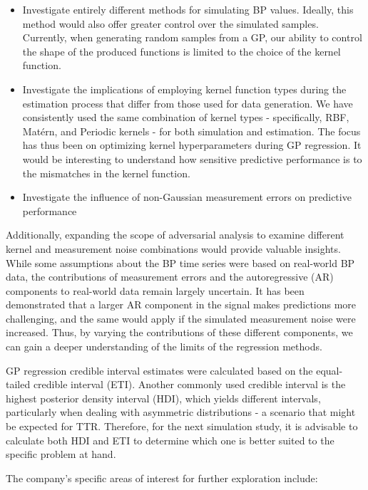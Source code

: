 \begin{itemize}
    \item Investigate entirely different methods for simulating BP values.
    Ideally, this method would also offer greater control over the simulated samples.
    Currently, when generating random samples from a GP, our ability to control the shape of the produced
    functions is limited to the choice of the kernel function.
    \item Investigate the implications of employing kernel function types
    during the estimation process that differ from those used for data generation.
    We have consistently used the same combination of kernel types - specifically, RBF, Matérn, and Periodic kernels -
    for both simulation and estimation.
    The focus has thus been on optimizing kernel hyperparameters during GP regression.
    It would be interesting to understand how sensitive predictive performance is to the mismatches in
    the kernel function.
    \item Investigate the influence
    of non-Gaussian measurement errors on predictive performance
\end{itemize}

Additionally, expanding the scope of adversarial analysis to examine different
kernel and measurement noise combinations would provide valuable insights.
While some assumptions about the BP time series were based on real-world BP data,
the contributions of measurement errors and the autoregressive (AR) components
to real-world data remain largely uncertain.
It has been demonstrated that a larger AR component in the signal makes predictions
more challenging, and the same would apply if the simulated measurement noise were increased.
Thus, by varying the contributions of these different components,
we can gain a deeper understanding of the limits of the regression methods.

GP regression credible interval estimates were calculated based on the equal-tailed
credible interval (ETI). Another commonly used credible interval is
the highest posterior density interval (HDI), which yields different intervals,
particularly when dealing with asymmetric distributions - a scenario that might be expected for TTR.
Therefore, for the next simulation study, it is advisable to calculate both HDI and ETI
to determine which one is better suited to the specific problem at hand.

The company's specific areas of interest for further exploration include:

